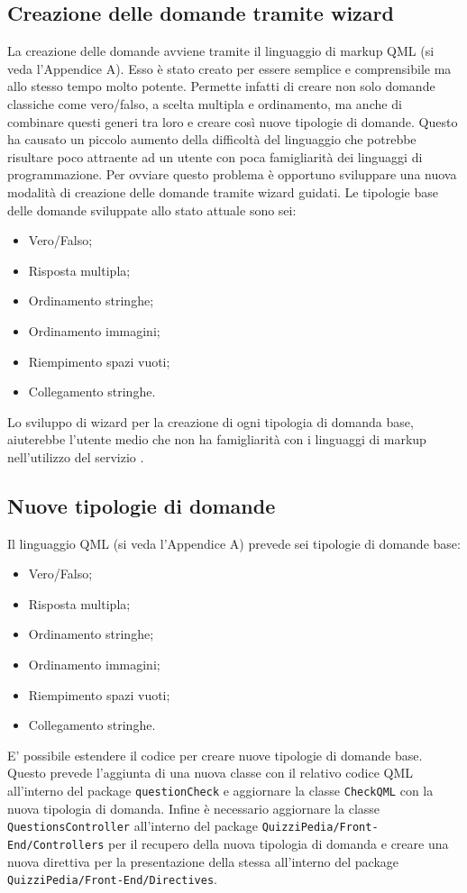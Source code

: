 \subsection{Creazione delle domande tramite wizard}
La creazione delle domande avviene tramite il linguaggio di markup QML (si veda l'Appendice A). Esso è stato creato per essere semplice e comprensibile ma allo stesso tempo molto potente. Permette infatti di creare non solo domande classiche come vero/falso, a scelta multipla e ordinamento, ma anche di combinare questi generi tra loro e creare così nuove tipologie di domande. Questo ha causato un piccolo aumento della difficoltà del linguaggio che potrebbe risultare poco attraente ad un utente con poca famigliarità dei linguaggi di programmazione. Per ovviare questo problema è opportuno sviluppare una nuova modalità di creazione delle domande tramite wizard guidati. Le tipologie base delle domande sviluppate allo stato attuale sono sei:
\begin{itemize}
	\item Vero/Falso;
	\item Risposta multipla;
	\item Ordinamento stringhe;
	\item Ordinamento immagini;
	\item Riempimento spazi vuoti;
	\item Collegamento stringhe.
\end{itemize}
Lo sviluppo di wizard per la creazione di ogni tipologia di domanda base, aiuterebbe l'utente medio che non ha famigliarità con i linguaggi di markup nell'utilizzo del servizio \progetto.   
\subsection{Nuove tipologie di domande}
Il linguaggio QML (si veda l'Appendice A) prevede sei tipologie di domande base:
\begin{itemize}
	\item Vero/Falso;
	\item Risposta multipla;
	\item Ordinamento stringhe;
	\item Ordinamento immagini;
	\item Riempimento spazi vuoti;
	\item Collegamento stringhe.
\end{itemize}
E' possibile estendere il codice per creare nuove tipologie di domande base. Questo prevede l'aggiunta di una nuova classe con il relativo codice QML all'interno del package \texttt{questionCheck} e aggiornare la classe \texttt{CheckQML} con la nuova tipologia di domanda. Infine è necessario aggiornare la classe \texttt{QuestionsController} all'interno del package \texttt{QuizziPedia/Front-End/Controllers} per il recupero della nuova tipologia di domanda e creare una nuova direttiva per la presentazione della stessa all'interno del package \texttt{QuizziPedia/Front-End/Directives}.
